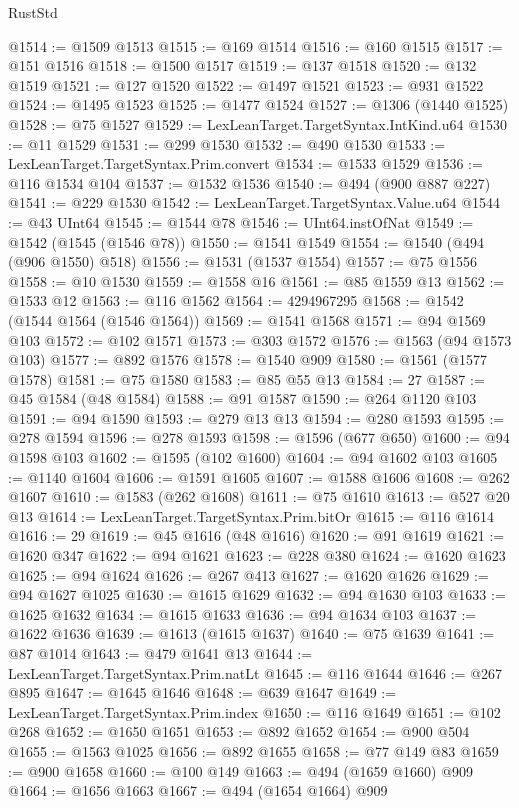 \begin{lexlean}{RustStd}
\begin{coremodule}
@1514 := @1509 @1513
@1515 := @169 @1514
@1516 := @160 @1515
@1517 := @151 @1516
@1518 := @1500 @1517
@1519 := @137 @1518
@1520 := @132 @1519
@1521 := @127 @1520
@1522 := @1497 @1521
@1523 := @931 @1522
@1524 := @1495 @1523
@1525 := @1477 @1524
@1527 := @1306 (@1440 @1525)
@1528 := @75 @1527
@1529 := LexLeanTarget.TargetSyntax.IntKind.u64
@1530 := @11 @1529
@1531 := @299 @1530
@1532 := @490 @1530
@1533 := LexLeanTarget.TargetSyntax.Prim.convert
@1534 := @1533 @1529
@1536 := @116 @1534 @104
@1537 := @1532 @1536
@1540 := @494 (@900 @887 @227)
@1541 := @229 @1530
@1542 := LexLeanTarget.TargetSyntax.Value.u64
@1544 := @43 UInt64
@1545 := @1544 @78
@1546 := UInt64.instOfNat
@1549 := @1542 (@1545 (@1546 @78))
@1550 := @1541 @1549
@1554 := @1540 (@494 (@906 @1550) @518)
@1556 := @1531 (@1537 @1554)
@1557 := @75 @1556
@1558 := @10 @1530
@1559 := @1558 @16
@1561 := @85 @1559 @13
@1562 := @1533 @12
@1563 := @116 @1562
@1564 := 4294967295
@1568 := @1542 (@1544 @1564 (@1546 @1564))
@1569 := @1541 @1568
@1571 := @94 @1569 @103
@1572 := @102 @1571
@1573 := @303 @1572
@1576 := @1563 (@94 @1573 @103)
@1577 := @892 @1576
@1578 := @1540 @909
@1580 := @1561 (@1577 @1578)
@1581 := @75 @1580
@1583 := @85 @55 @13
@1584 := 27
@1587 := @45 @1584 (@48 @1584)
@1588 := @91 @1587
@1590 := @264 @1120 @103
@1591 := @94 @1590
@1593 := @279 @13 @13
@1594 := @280 @1593
@1595 := @278 @1594
@1596 := @278 @1593
@1598 := @1596 (@677 @650)
@1600 := @94 @1598 @103
@1602 := @1595 (@102 @1600)
@1604 := @94 @1602 @103
@1605 := @1140 @1604
@1606 := @1591 @1605
@1607 := @1588 @1606
@1608 := @262 @1607
@1610 := @1583 (@262 @1608)
@1611 := @75 @1610
@1613 := @527 @20 @13
@1614 := LexLeanTarget.TargetSyntax.Prim.bitOr
@1615 := @116 @1614
@1616 := 29
@1619 := @45 @1616 (@48 @1616)
@1620 := @91 @1619
@1621 := @1620 @347
@1622 := @94 @1621
@1623 := @228 @380
@1624 := @1620 @1623
@1625 := @94 @1624
@1626 := @267 @413
@1627 := @1620 @1626
@1629 := @94 @1627 @1025
@1630 := @1615 @1629
@1632 := @94 @1630 @103
@1633 := @1625 @1632
@1634 := @1615 @1633
@1636 := @94 @1634 @103
@1637 := @1622 @1636
@1639 := @1613 (@1615 @1637)
@1640 := @75 @1639
@1641 := @87 @1014
@1643 := @479 @1641 @13
@1644 := LexLeanTarget.TargetSyntax.Prim.natLt
@1645 := @116 @1644
@1646 := @267 @895
@1647 := @1645 @1646
@1648 := @639 @1647
@1649 := LexLeanTarget.TargetSyntax.Prim.index
@1650 := @116 @1649
@1651 := @102 @268
@1652 := @1650 @1651
@1653 := @892 @1652
@1654 := @900 @504
@1655 := @1563 @1025
@1656 := @892 @1655
@1658 := @77 @149 @83
@1659 := @900 @1658
@1660 := @100 @149
@1663 := @494 (@1659 @1660) @909
@1664 := @1656 @1663
@1667 := @494 (@1654 @1664) @909

\end{coremodule}
\end{lexlean}
